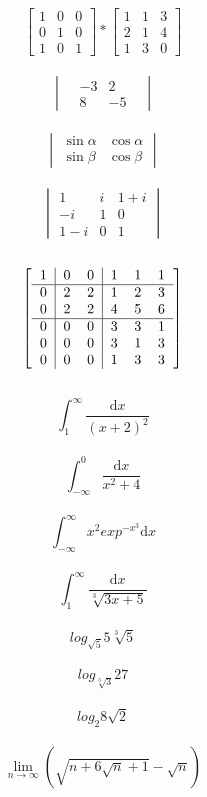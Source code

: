 \documentclass[12pt]{article}
\begin{document}
\\
$$\begin{bmatrix}
1 & 0 & 0\\
0 & 1 & 0\\
1 & 0 & 1
\end{bmatrix}
*
\begin{bmatrix}
1 & 1 & 3\\
2& 1 & 4\\
1 & 3 & 0
\end{bmatrix}$$
\\
$$\begin{vmatrix}
 &-3 &  2&\\
 &8 & -5&
\end{vmatrix}$$
\\
$$\begin{vmatrix}
\sin \alpha & \cos \alpha\\
\sin \beta & \cos \beta
\end{vmatrix}$$
\\
$$\begin{vmatrix}
1 & i & 1+i\\
-i & 1 & 0\\
1-i & 0 & 1
\end{vmatrix}$$
\\
$$\begin{bmatrix}
\begin{tabular}{c | c c | c c c}
1 & 0 & 0 & 1 & 1 & 1\\
\hline
0 & 2 & 2 & 1 & 2 & 3\\
0 & 2 & 2 & 4 & 5 & 6\\
\hline
0 & 0 & 0 & 3 & 3 & 1\\
0 & 0 & 0 & 3 & 1 & 3\\
0 & 0 & 0 & 1 & 3 & 3
\end{tabular}
\end{bmatrix}$$
\\
$$ \int^{\infty}_{1} \frac{\mathrm{d} x}{(x+2)^2} $$
\\
$$ \int^0_{-\infty} \frac{\mathrm{d} x}{x^2 +4}$$
\\
$$ \int^{\infty}_{-\infty} x^2 exp^{-x^{3}} \mathrm{d} x$$
\\
$$ \int^{\infty}_{1} \frac{\mathrm{d}x}{\sqrt[3]{3x+5}}$$
\\
$$ log_{\sqrt{5}} 5 \sqrt[3]{5} $$
\\
$$ log_{\sqrt[3]{3}} 27 $$
\\
$$ log_{2} 8 \sqrt{2} $$
\\
$$ \lim_{n \rightarrow \infty} (\sqrt{n + 6\sqrt{n} + 1}-\sqrt{n}) $$
\end{document}
